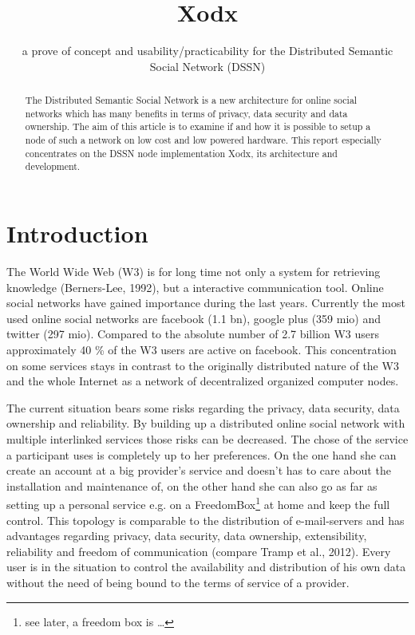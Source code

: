 \documentclass{llncs}
\title{Xodx}
\subtitle{a prove of concept and usability/practicability for the Distributed Semantic Social Network (DSSN)}
\author{}
\institute{\email{\{lastname\}@informatik.uni-leipzig.de}}
\begin{document}
\maketitle

\begin{abstract}
The Distributed Semantic Social Network is a new architecture for online social networks which has many benefits in terms of privacy, data security and data ownership.
The aim of this article is to examine if and how it is possible to setup a node of such a network on low cost and low powered hardware.
This report especially concentrates on the DSSN node implementation Xodx, its architecture and development.
\end{abstract}


\section{Introduction}
The World Wide Web (W3) is for long time not only a system for retrieving knowledge (Berners-Lee, 1992), but a interactive communication tool.
Online social networks have gained importance during the last years.
Currently the most used online social networks are facebook (1.1 bn), google plus (359 mio) and twitter (297 mio).
Compared to the absolute number of 2.7 billion W3 users approximately 40 \% of the W3 users are active on facebook.
This concentration on some services stays in contrast to the originally distributed nature of the W3 and the whole Internet as a network of decentralized organized computer nodes.

The current situation bears some risks regarding the privacy, data security, data ownership and reliability.
By building up a distributed online social network with multiple interlinked services those risks can be decreased.
The chose of the service a participant uses is completely up to her preferences.
On the one hand she can create an account at a big provider's service and doesn't has to care about the installation and maintenance of, on the other hand she can also go as far as setting up a personal service e.g. on a FreedomBox\footnote{see later, a freedom box is …} at home and keep the full control.
This topology is comparable to the distribution of e-mail-servers and has advantages regarding privacy, data security, data ownership, extensibility, reliability and freedom of communication (compare Tramp et al., 2012).
Every user is in the situation to control the availability and distribution of his own data without the need of being bound to the terms of service of a provider.
\end{document}
